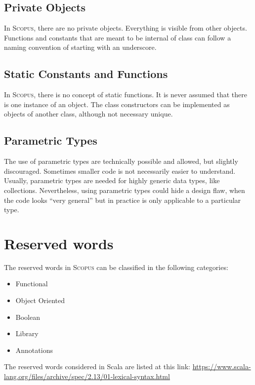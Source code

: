 \documentclass[12pt,a4paper]{book}
\newcommand{\Scopus}{\textsc{Scopus}\xspace}
\begin{document}
    \section{Private Objects}

    In \Scopus, there are no private objects.
    Everything is visible from other objects.
    Functions and constants that are meant to be internal of class can follow a naming convention of starting with an underscore.


    \section{Static Constants and Functions}

    In \Scopus, there is no concept of static functions.
    It is never assumed that there is one instance of an object.
    The class constructors can be implemented as objects of another class, although not necessary unique.


    \section{Parametric Types}

    The use of parametric types are technically possible and allowed, but slightly discouraged.
    Sometimes smaller code is not necessarily easier to understand.
    Usually, parametric types are needed for highly generic data types, like collections.
    Nevertheless, using parametric types could hide a design flaw, when the code looks ``very general'' but in practice is only applicable to a particular type.


    \chapter{Reserved words}

    The reserved words in \Scopus can be classified in the following categories:

    \begin{itemize}
        \item Functional
        \item Object Oriented
        \item Boolean
        \item Library
        \item Annotations
    \end{itemize}


    The reserved words considered in Scala are listed at this link:
    \url{https://www.scala-lang.org/files/archive/spec/2.13/01-lexical-syntax.html}
\end{document}
